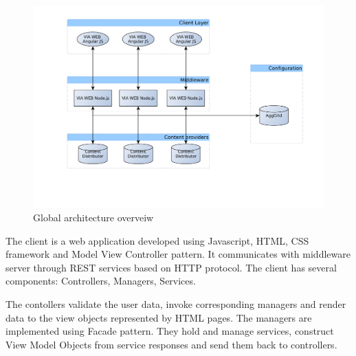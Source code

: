 





\begin{figure}[h]
    \centering
	\includegraphics[width=\textwidth]{images/thesis_global_architecture_existing.png}
    \caption{Global architecture overveiw}
    \label{fig:arch_overview}
\end{figure}


The client is a web application developed using Javascript, HTML, CSS framework and Model View Controller pattern. It communicates with middleware server through REST services based on HTTP protocol. The client has several components: Controllers, Managers, Services. 

The contollers validate the user data, invoke corresponding managers and render data to the view objects represented by HTML pages. The managers are implemented using Facade pattern\cite{DesignPatterns}. They hold and manage services, construct View Model Objects from service responses and send them back to controllers. 

